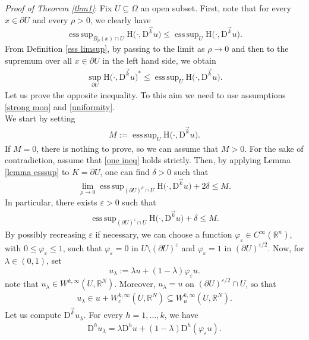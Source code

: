 \documentclass[a4paper,11pt]{article}
\numberwithin{equation}{section}
\newcommand{\numberset}{\mathbb}
\newcommand{\eps}{\varepsilon}
\newcommand{\Om}{\Omega}
\newcommand{\R}{\numberset{R}}
\newcommand{\rom}{\mathrm}
\DeclareMathOperator*{\esssup}{ess\,sup}
\theoremstyle{definition}
\begin{document}
\noindent \textit{Proof of Theorem \ref{thm1}}: Fix $U\subseteq\Om$ an open subset. First, note that for every $x\in\partial U$ and every $\rho>0$, we clearly have
$$
\esssup_{B_\rho(x)\cap U}\rom{H}\big (\cdot,\mathrm D^{\vec{k}}u \big)\leq \esssup_{ U}\rom{H}\big (\cdot,\mathrm D^{\vec{k}}u \big).
$$ 
From Definition \ref{ess limsup}, by passing to the limit as $\rho\to  0$ and then to the supremum over all $x\in\partial U$ in the left hand side, we obtain
\begin{align}\label{one ineq}
\sup_{\partial U}\rom{H} \big (\cdot,\mathrm D^{\vec{k}}u \big)^*\leq\esssup_U \rom{H}\big (\cdot,\mathrm D^{\vec{k}}u \big).
\end{align}
Let us prove the opposite inequality. To this aim we need to use assumptions \eqref{strong mon} and \eqref{uniformity}.\\
We start by setting 
\begin{align}\label{M}
M:=\esssup_U \rom{H}\big (\cdot,\mathrm D^{\vec{k}}u \big).
\end{align}
If $M=0$, there is nothing to prove, so we can assume that $M>0$.
For the sake of contradiction, assume that \eqref{one ineq} holds strictly. Then, by applying Lemma \ref{lemma esssup} to $K=\partial U$, one can find $\delta>0$ such that
$$
\lim_{\rho\to  0}\esssup_{(\partial U)^\rho\cap U}\rom{H}\big (\cdot,\mathrm D^{\vec{k}}u \big)+2\delta\leq M.
$$
In particular, there exists $\eps>0$ such that
\begin{align}\label{from contr}
\esssup_{(\partial U)^{\eps}\cap U}\rom{H}\big (\cdot,\mathrm D^{\vec{k}}u \big)+\delta\leq M.
\end{align}
By possibly recreasing $\eps$ if necessary, we can choose a function $\varphi_\eps\in C^\infty(\R^n)$, with $0\leq\varphi_\eps\leq1$, such that $\varphi_\eps=0$ in $U\setminus (\partial U)^\eps$ and $\varphi_\eps=1$ in $(\partial U)^{\eps/2}$. Now, for $\lambda\in(0,1)$, set
$$
u_\lambda:=\lambda u + (1-\lambda)\varphi_\eps u.
$$
note that $u_\lambda\in W^{k,\infty}{(U,\R^N)}$. Moreover, $u_\lambda=u$ on $(\partial U)^{\eps/2}\cap U$, so that 
\begin{align}\label{u lambda}
u_\lambda\in u+W^{k,\infty}_c(U,\R^N)\subseteq W_u^{k,\infty}(U,\R^N).
\end{align}
Let us compute $\mathrm D^{\vec{k}} u_\lambda$.  For every $h=1,\ldots, k$, we have
\begin{align}\label{deriv product}
\mathrm D^hu_\lambda=\lambda \mathrm D^h u+(1-\lambda)\mathrm D^h(\varphi_\eps u).
\end{align}
\end{document}
